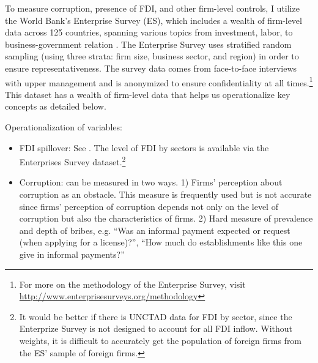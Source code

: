 To measure corruption, presence of FDI, and other firm-level controls, I utilize the World Bank's Enterprise Survey (ES), which includes a wealth of firm-level data across 125 countries, spanning various topics from investment, labor, to business-government relation \citep{WorldBank2015}. The Enterprise Survey uses stratified random sampling (using three strata: firm size, business sector, and region) in order to ensure representativeness. The survey data comes from face-to-face interviews with upper management and is anonymized to ensure confidentiality at all times.\footnote{For more on the methodology of the Enterprise Survey, visit \url{http://www.enterprisesurveys.org/methodology}} This dataset has a wealth of firm-level data that helps us operationalize key concepts as detailed below.

Operationalization of variables:
\begin{itemize}
\item FDI spillover: See . The level of FDI by sectors is available via the Enterprises Survey dataset.\footnote{It would be better if there is UNCTAD data for FDI by sector, since the Enterprize Survey is not designed to account for all FDI inflow. Without weights, it is difficult to accurately get the population of foreign firms from the ES' sample of foreign firms.}

\item Corruption: can be measured in two ways. 1) Firms' perception about corruption as an obstacle. This measure is frequently used but is not accurate since firms' perception of corruption depends not only on the level of corruption but also the characteristics of firms. 2) Hard measure of prevalence and depth of bribes, e.g. ``Was an informal payment expected or request (when applying for a license)?'', ``How much do establishments like this one give in informal payments?'' 
\end{itemize}